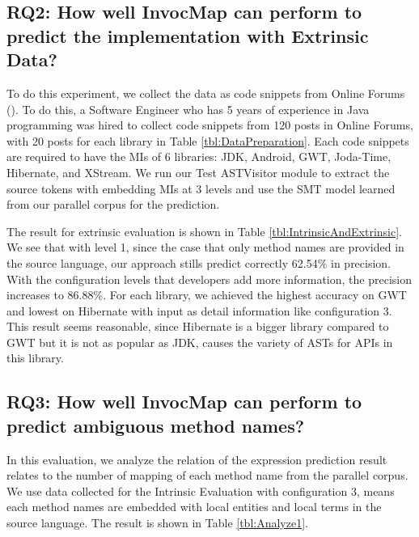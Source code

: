 \subsection{RQ2: How well InvocMap can perform to predict the implementation with Extrinsic Data?}

To do this experiment, we collect the data as code snippets from Online Forums (\cite{id:StackOverflow,id:ProgramCreek,id:GeeksForGeeks}). To do this, a Software Engineer who has 5 years of experience in Java programming was hired to collect code snippets from 120 posts in Online Forums, with 20 posts for each library in Table \ref{tbl:DataPreparation}. Each code snippets are required to have the MIs of 6 libraries: JDK, Android, GWT, Joda-Time, Hibernate, and XStream. We run our Test ASTVisitor module to extract the source tokens with embedding MIs at 3 levels and use the SMT model learned from our parallel corpus for the prediction.

The result for extrinsic evaluation is shown in Table \ref{tbl:IntrinsicAndExtrinsic}. We see that with level 1, since the case that only method names are provided in the source language, our approach stills predict correctly 62.54\% in precision. With the configuration levels that developers add more information, the precision increases to 86.88\%. For each library, we achieved the highest accuracy on GWT and lowest on Hibernate with input as detail information like configuration 3. This result seems reasonable, since Hibernate is a bigger library compared to GWT but it is not as popular as JDK, causes the variety of ASTs for APIs in this library.




\subsection{RQ3: How well InvocMap can perform to predict ambiguous method names?}

In this evaluation, we analyze the relation of the expression prediction result relates to the number of mapping of each method name from the parallel corpus. We use data collected for the Intrinsic Evaluation with configuration 3, means each method names are embedded with local entities and local terms in the source language. The result is shown in Table \ref{tbl:Analyze1}.

